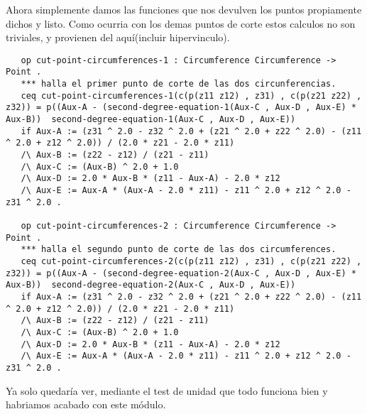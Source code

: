 \documentclass[12pt,a4paper]{book}
\begin{document}
Ahora simplemente damos las funciones que nos devulven los puntos propiamente dichos y listo. Como ocurria con los demas puntos de corte estos calculos no son triviales, y provienen del aqu\'i(incluir hipervinculo). 

\begin{verbatim}
   op cut-point-circumferences-1 : Circumference Circumference -> Point .
   *** halla el primer punto de corte de las dos circunferencias.
   ceq cut-point-circumferences-1(c(p(z11 z12) , z31) , c(p(z21 z22) , z32)) = p((Aux-A - (second-degree-equation-1(Aux-C , Aux-D , Aux-E) * Aux-B))  second-degree-equation-1(Aux-C , Aux-D , Aux-E))
   if Aux-A := (z31 ^ 2.0 - z32 ^ 2.0 + (z21 ^ 2.0 + z22 ^ 2.0) - (z11 ^ 2.0 + z12 ^ 2.0)) / (2.0 * z21 - 2.0 * z11) 
   /\ Aux-B := (z22 - z12) / (z21 - z11) 
   /\ Aux-C := (Aux-B) ^ 2.0 + 1.0
   /\ Aux-D := 2.0 * Aux-B * (z11 - Aux-A) - 2.0 * z12
   /\ Aux-E := Aux-A * (Aux-A - 2.0 * z11) - z11 ^ 2.0 + z12 ^ 2.0 - z31 ^ 2.0 .

   op cut-point-circumferences-2 : Circumference Circumference -> Point .
   *** halla el segundo punto de corte de las dos circumferences.
   ceq cut-point-circumferences-2(c(p(z11 z12) , z31) , c(p(z21 z22) , z32)) = p((Aux-A - (second-degree-equation-2(Aux-C , Aux-D , Aux-E) * Aux-B))  second-degree-equation-2(Aux-C , Aux-D , Aux-E))
   if Aux-A := (z31 ^ 2.0 - z32 ^ 2.0 + (z21 ^ 2.0 + z22 ^ 2.0) - (z11 ^ 2.0 + z12 ^ 2.0)) / (2.0 * z21 - 2.0 * z11) 
   /\ Aux-B := (z22 - z12) / (z21 - z11) 
   /\ Aux-C := (Aux-B) ^ 2.0 + 1.0
   /\ Aux-D := 2.0 * Aux-B * (z11 - Aux-A) - 2.0 * z12
   /\ Aux-E := Aux-A * (Aux-A - 2.0 * z11) - z11 ^ 2.0 + z12 ^ 2.0 - z31 ^ 2.0 .

\end{verbatim}

Ya solo quedar\'ia ver, mediante el test de unidad que todo funciona bien y habriamos acabado con este m\'odulo.\\
\end{document}
